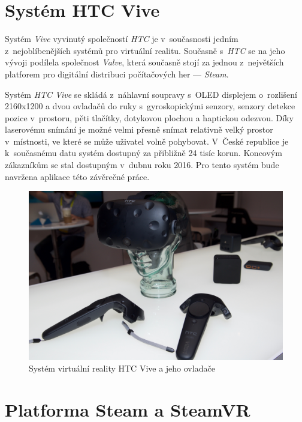\section{Systém HTC Vive}\label{systuxe9m-htc-vive}

Systém \emph{Vive} vyvinutý společností \emph{HTC} je v~současnosti jedním z~nejoblíbenějších systémů pro virtuální realitu. \autocite{vivepopular} Současně
s~\emph{HTC} se na jeho vývoji podílela společnost \emph{Valve}, která současně stojí za jednou z~největších platforem pro digitální
distribuci počítačových her --- \emph{Steam}.

Systém \emph{HTC Vive} se skládá z~náhlavní soupravy s~OLED displejem
o~rozlišení 2160x1200 a dvou ovladačů do ruky s~gyroskopickými senzory,
senzory detekce pozice v~prostoru, pěti tlačítky, dotykovou plochou a
haptickou odezvou. \autocite{vivespec} Díky laserovému snímání je možné velmi přesně snímat
relativně velký prostor v~místnosti, ve které se může uživatel volně
pohybovat. V~České republice je k~současnému datu systém dostupný za
přibližně 24 tisíc korun. \autocite{viveprice} Koncovým zákazníkům se stal dostupným v~dubnu
roku 2016. Pro tento systém bude navržena aplikace této závěrečné práce.

\begin{figure}[h!]
\centering
\includegraphics[width=12cm]{src/assets/vive-pre.jpeg}
\caption{Systém virtuální reality HTC Vive a jeho ovladače\autocite{htcvivepre}}
\end{figure}

\newpage

\section{Platforma Steam a SteamVR}\label{platforma-steam-a-steamvr}

